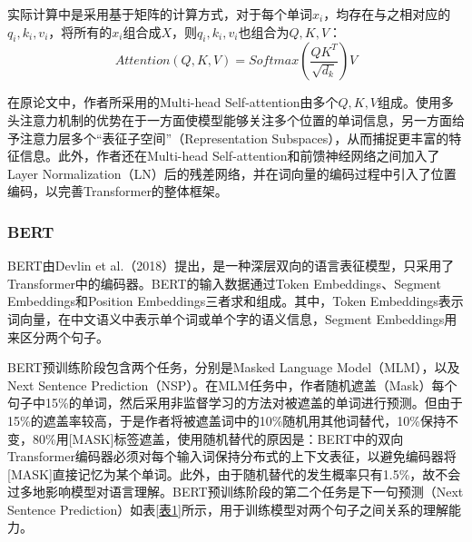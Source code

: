 \documentclass[lang=cn]{elegantpaper}
\begin{document}
实际计算中是采用基于矩阵的计算方式，对于每个单词$x_i$，均存在与之相对应的$q_i,k_i,v_i$，将所有的$x_i$组合成$X$，则$q_i,k_i,v_i$也组合为$Q,K,V$：
\begin{equation}
    Attention(Q,K,V)=Softmax\left(\frac{QK^T}{\sqrt {d_k}}\right)V
\end{equation}

在原论文中，作者所采用的Multi-head Self-attention由多个$Q,K,V$组成。使用多头注意力机制的优势在于一方面使模型能够关注多个位置的单词信息，另一方面给予注意力层多个“表征子空间”（Representation Subspaces），从而捕捉更丰富的特征信息。此外，作者还在Multi-head Self-attention和前馈神经网络之间加入了Layer Normalization（LN）后的残差网络，并在词向量的编码过程中引入了位置编码，以完善Transformer的整体框架。

\subsubsection{BERT}
BERT由Devlin et al.（2018）\cite{27}提出，是一种深层双向的语言表征模型，只采用了Transformer中的编码器。BERT的输入数据通过Token Embeddings、Segment Embeddings和Position Embeddings三者求和组成。其中，Token Embeddings表示词向量，在中文语义中表示单个词或单个字的语义信息，Segment Embeddings用来区分两个句子。%

BERT预训练阶段包含两个任务，分别是Masked Language Model（MLM），以及Next Sentence Prediction（NSP）。在MLM任务中，作者随机遮盖（Mask）每个句子中15\%的单词，然后采用非监督学习的方法对被遮盖的单词进行预测。但由于15\%的遮盖率较高，于是作者将被遮盖词中的10\%随机用其他词替代，10\%保持不变，80\%用[MASK]标签遮盖，使用随机替代的原因是：BERT中的双向Transformer编码器必须对每个输入词保持分布式的上下文表征，以避免编码器将[MASK]直接记忆为某个单词。此外，由于随机替代的发生概率只有1.5\%，故不会过多地影响模型对语言理解。BERT预训练阶段的第二个任务是下一句预测（Next Sentence Prediction）如表\ref{表1}所示，用于训练模型对两个句子之间关系的理解能力。
\end{document}

